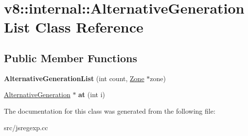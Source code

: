 \hypertarget{classv8_1_1internal_1_1_alternative_generation_list}{}\section{v8\+:\+:internal\+:\+:Alternative\+Generation\+List Class Reference}
\label{classv8_1_1internal_1_1_alternative_generation_list}
\subsection*{Public Member Functions}
\begin{DoxyCompactItemize}
\item 
\hypertarget{classv8_1_1internal_1_1_alternative_generation_list_a12e31ade267f3b97c25bf9201fe3b65a}{}{\bfseries Alternative\+Generation\+List} (int count, \hyperlink{classv8_1_1internal_1_1_zone}{Zone} $\ast$zone)\label{classv8_1_1internal_1_1_alternative_generation_list_a12e31ade267f3b97c25bf9201fe3b65a}

\item 
\hypertarget{classv8_1_1internal_1_1_alternative_generation_list_a074eac77994a3714b4214b777fce5b2a}{}\hyperlink{classv8_1_1internal_1_1_alternative_generation}{Alternative\+Generation} $\ast$ {\bfseries at} (int i)\label{classv8_1_1internal_1_1_alternative_generation_list_a074eac77994a3714b4214b777fce5b2a}

\end{DoxyCompactItemize}


The documentation for this class was generated from the following file\+:\begin{DoxyCompactItemize}
\item 
src/jsregexp.\+cc\end{DoxyCompactItemize}
